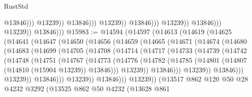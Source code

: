 \begin{lexlean}{RustStd}
\begin{coremodule}
                                                  @13846)))
                                            @13239))
                                        @13846)))
                                  @13239))
                              @13846)))
                        @13239))
                    @13846)))
              @13239))
          @13846)))
@15983 := @14594
    (@14597
      (@14613
        (@14619
          (@14625
            (@14641
              (@14647
                (@14650
                  (@14656
                    (@14659
                      (@14665
                        (@14671
                          (@14674
                            (@14680
                              (@14683
                                (@14699
                                  (@14705
                                    (@14708
                                      (@14714
                                        (@14717
                                          (@14733
                                            (@14739
                                              (@14742
                                                (@14748
                                                  (@14751
                                                    (@14767
                                                      (@14773
                                                        (@14776
                                                          (@14782
                                                            (@14785
                                                              (@14801
                                                                (@14807
                                                                  (@14810 (@15904 @13239))
                                                                  @13846)))
                                                            @13239))
                                                        @13846)))
                                                  @13239))
                                              @13846)))
                                        @13239))
                                    @13846)))
                              @13239))
                          @13846)))
                    @13239))
                (@13517
                  @862
                  @120
                  @50
                  @28
                  @4232
                  @3292
                  (@13525
                    @862
                    @50
                    @4232
                    (@13628
                      @861

\end{coremodule}
\end{lexlean}
